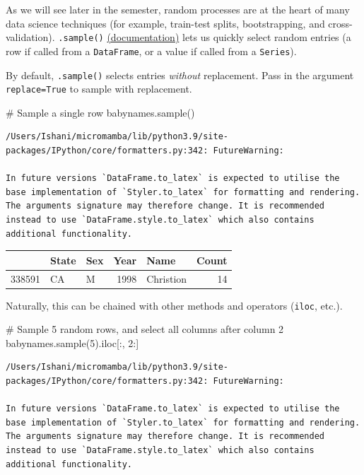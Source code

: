 \documentclass[
  letterpaper,
  DIV=11,
  numbers=noendperiod]{scrreprt}
\newenvironment{Shaded}{\begin{snugshade}}{\end{snugshade}}
\newcommand{\CommentTok}[1]{\textcolor[rgb]{0.37,0.37,0.37}{#1}}
\newcommand{\DecValTok}[1]{\textcolor[rgb]{0.68,0.00,0.00}{#1}}
\newcommand{\NormalTok}[1]{\textcolor[rgb]{0.00,0.23,0.31}{#1}}
\begin{document}
As we will see later in the semester, random processes are at the heart
of many data science techniques (for example, train-test splits,
bootstrapping, and cross-validation). \texttt{.sample()}
\href{https://pandas.pydata.org/docs/reference/api/pandas.DataFrame.sample.html}{(documentation)}
lets us quickly select random entries (a row if called from a
\texttt{DataFrame}, or a value if called from a \texttt{Series}).

By default, \texttt{.sample()} selects entries \emph{without}
replacement. Pass in the argument \texttt{replace=True} to sample with
replacement.

\begin{Shaded}
\begin{Highlighting}[]
\CommentTok{\# Sample a single row}
\NormalTok{babynames.sample()}
\end{Highlighting}
\end{Shaded}

\begin{verbatim}
/Users/Ishani/micromamba/lib/python3.9/site-packages/IPython/core/formatters.py:342: FutureWarning:

In future versions `DataFrame.to_latex` is expected to utilise the base implementation of `Styler.to_latex` for formatting and rendering. The arguments signature may therefore change. It is recommended instead to use `DataFrame.style.to_latex` which also contains additional functionality.
\end{verbatim}

\begin{tabular}{lllrlr}
\toprule
{} & State & Sex &  Year &       Name &  Count \\
\midrule
338591 &    CA &   M &  1998 &  Christion &     14 \\
\bottomrule
\end{tabular}

Naturally, this can be chained with other methods and operators
(\texttt{iloc}, etc.).

\begin{Shaded}
\begin{Highlighting}[]
\CommentTok{\# Sample 5 random rows, and select all columns after column 2}
\NormalTok{babynames.sample(}\DecValTok{5}\NormalTok{).iloc[:, }\DecValTok{2}\NormalTok{:]}
\end{Highlighting}
\end{Shaded}

\begin{verbatim}
/Users/Ishani/micromamba/lib/python3.9/site-packages/IPython/core/formatters.py:342: FutureWarning:

In future versions `DataFrame.to_latex` is expected to utilise the base implementation of `Styler.to_latex` for formatting and rendering. The arguments signature may therefore change. It is recommended instead to use `DataFrame.style.to_latex` which also contains additional functionality.
\end{verbatim}
\end{document}

